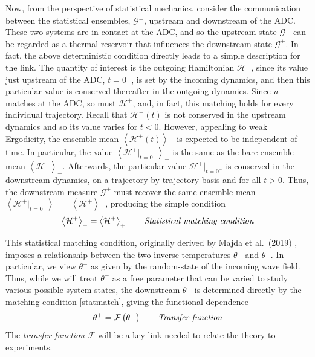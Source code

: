 \documentclass[11pt]{article}
\newcommand{\mean}[1]{\left< #1 \right>}
\newcommand{\depth}{d}
\newcommand{\Ham}{\mathcal{H}}
\newcommand{\Hdn}{\Ham^{+}}
\newcommand{\Gibbs}{\mathcal{G}}
\newcommand{\Gup}{\Gibbs^{-}}
\newcommand{\Gdn}{\Gibbs^{+}}
\newcommand{\Gupdn}{\Gibbs^{\pm}}
\newcommand{\thup}{\theta^{-}}
\newcommand{\thdn}{\theta^{+}}
\newcommand{\meanup}[1]{\mean{#1}_{-}}
\newcommand{\meandn}[1]{\mean{#1}_{+}}
\newcommand{\transf}{\mathcal{F}}
\begin{document}
	Now, from the perspective of statistical mechanics, consider the communication between the statistical ensembles, $\Gupdn$, upstream and downstream of the ADC. These two systems are in contact at the ADC, and so the upstream state $\Gup$ can be regarded as a thermal reservoir that influences the downstream state $\Gdn$. In fact, the above deterministic  condition directly leads to a simple description for the link. The quantity of interest is the outgoing Hamiltonian $\Hdn$, since its value just upstream of the ADC, $t=0^{-}$, is set by the incoming dynamics, and then this particular value is conserved thereafter in the outgoing dynamics. Since $u$ matches at the ADC, so must $\Hdn$, and, in fact, this matching holds for every individual trajectory. Recall that $\Hdn(t)$ is not conserved in the upstream dynamics and so its value varies for $t < 0$. However, appealing to weak Ergodicity, the ensemble mean $\meanup{\Hdn(t)}$ is expected to be independent of time. In particular, the value $\meanup{\Hdn \vert_{t=0^{-}} }$ is the same as the bare ensemble mean $\meanup{\Hdn}$. Afterwards, the particular value $\Hdn \vert_{t=0^{-}}$ is conserved in the downstream dynamics, on a trajectory-by-trajectory basis and for all $t>0$. Thus, the downstream measure $\Gdn$ must recover the same ensemble mean $\meanup{\Hdn \vert_{t=0^{-}} } = \meanup{\Hdn}$, producing the simple condition
\begin{align}
\label{statmatch}
\meanup{\Hdn} = \meandn{\Hdn}
\qquad \mbox{\em Statistical matching condition}
\end{align}

	This statistical matching condition, originally derived by Majda et al.~(2019) \cite{majda2019}, imposes a relationship between the two inverse temperatures $\thup$ and $\thdn$. In particular, we view $\thup$ as given by the random-state of the incoming wave field. Thus, while we will treat $\thup$ as a free parameter that can be varied to study various possible system states, the downstream $\thdn$ is determined directly by the matching condition \eqref{statmatch}, giving the functional dependence
\begin{equation}
\thdn = \transf \left( \thup \right)
\qquad \mbox{\em Transfer function}
\end{equation}
The {\em transfer function} $\transf$ will be a key link needed to relate the theory to experiments.

\end{document}
